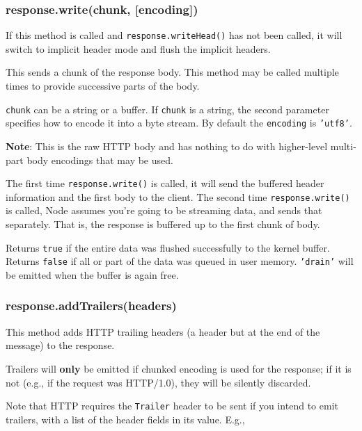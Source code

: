 \subsubsection{response.write(chunk, {[}encoding{]})}

If this method is called and \texttt{response.writeHead()} has not been
called, it will switch to implicit header mode and flush the implicit
headers.

This sends a chunk of the response body. This method may be called
multiple times to provide successive parts of the body.

\texttt{chunk} can be a string or a buffer. If \texttt{chunk} is a
string, the second parameter specifies how to encode it into a byte
stream. By default the \texttt{encoding} is \texttt{'utf8'}.

\textbf{Note}: This is the raw HTTP body and has nothing to do with
higher-level multi-part body encodings that may be used.

The first time \texttt{response.write()} is called, it will send the
buffered header information and the first body to the client. The second
time \texttt{response.write()} is called, Node assumes you're going to
be streaming data, and sends that separately. That is, the response is
buffered up to the first chunk of body.

Returns \texttt{true} if the entire data was flushed successfully to the
kernel buffer. Returns \texttt{false} if all or part of the data was
queued in user memory. \texttt{'drain'} will be emitted when the buffer
is again free.

\subsubsection{response.addTrailers(headers)}

This method adds HTTP trailing headers (a header but at the end of the
message) to the response.

Trailers will \textbf{only} be emitted if chunked encoding is used for
the response; if it is not (e.g., if the request was HTTP/1.0), they
will be silently discarded.

Note that HTTP requires the \texttt{Trailer} header to be sent if you
intend to emit trailers, with a list of the header fields in its value.
E.g.,

\begin{Shaded}
\begin{Highlighting}[]
\NormalTok{(}\NormalTok{, \{ }\NormalTok{: }\NormalTok{,}
                          \NormalTok{: } \NormalTok{\});}
\NormalTok{(\{}\NormalTok{: }\NormalTok{\});}
\NormalTok{();}
\end{Highlighting}
\end{Shaded}


